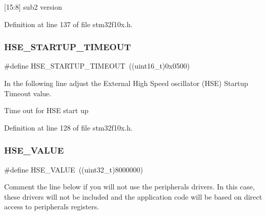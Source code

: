 \mbox{[}15\+:8\mbox{]} sub2 version 

Definition at line 137 of file stm32f10x.\+h.

\mbox{\label{group___library__configuration__section_ga68ecbc9b0a1a40a1ec9d18d5e9747c4f}} 
\subsubsection{\texorpdfstring{H\+S\+E\+\_\+\+S\+T\+A\+R\+T\+U\+P\+\_\+\+T\+I\+M\+E\+O\+UT}{HSE\_STARTUP\_TIMEOUT}}
{\footnotesize\ttfamily \#define H\+S\+E\+\_\+\+S\+T\+A\+R\+T\+U\+P\+\_\+\+T\+I\+M\+E\+O\+UT~((uint16\+\_\+t)0x0500)}



In the following line adjust the External High Speed oscillator (H\+SE) Startup Timeout value. 

Time out for H\+SE start up 

Definition at line 128 of file stm32f10x.\+h.

\mbox{\label{group___library__configuration__section_gaeafcff4f57440c60e64812dddd13e7cb}} 
\subsubsection{\texorpdfstring{H\+S\+E\+\_\+\+V\+A\+L\+UE}{HSE\_VALUE}}
{\footnotesize\ttfamily \#define H\+S\+E\+\_\+\+V\+A\+L\+UE~((uint32\+\_\+t)8000000)}



Comment the line below if you will not use the peripherals drivers. In this case, these drivers will not be included and the application code will be based on direct access to peripherals registers. 

